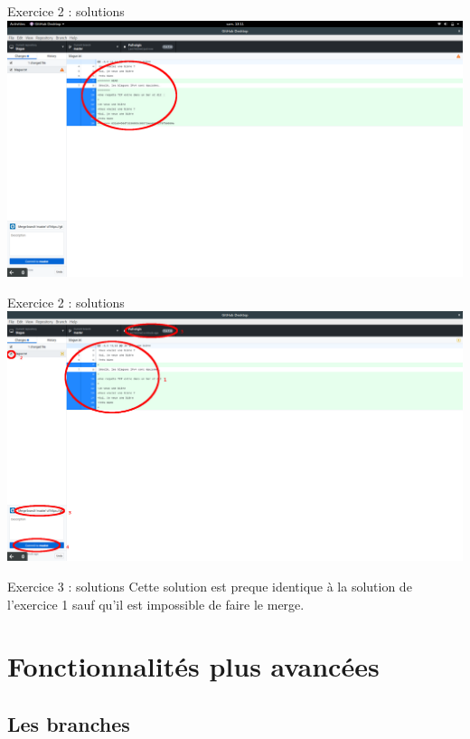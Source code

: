 \documentclass{beamer}
\begin{document}
\begin{frame}{Exercice 2 : solutions}
	\centering
    \includegraphics[scale=0.16]{img/image_exercices/conflic_to_resolve.png}
\end{frame}

\begin{frame}{Exercice 2 : solutions}
	\centering
    \includegraphics[scale=0.16]{img/image_exercices/conflic_resolv.png}
\end{frame}

\begin{frame}{Exercice 3 : solutions}
	Cette solution est preque identique à la solution de l'exercice 1 sauf qu'il est impossible de faire le merge.
\end{frame}

\section{Fonctionnalités plus avancées}

\subsection{Les branches}
\end{document}
